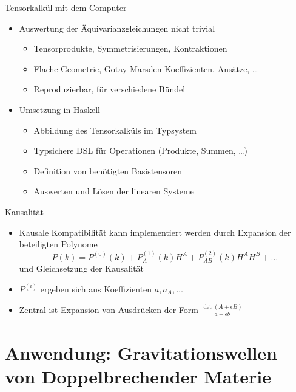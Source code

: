 \documentclass{beamer}
\begin{document}
    \begin{frame}{Tensorkalkül mit dem Computer}
        \begin{itemize}
            \item Auswertung der Äquivarianzgleichungen nicht trivial
            \begin{itemize}
                \item Tensorprodukte, Symmetrisierungen, Kontraktionen
                \item Flache Geometrie, Gotay-Marsden-Koeffizienten, Ansätze, \ldots
                \item Reproduzierbar, für verschiedene Bündel
            \end{itemize}
            \item Umsetzung in Haskell
            \begin{itemize}
                \item Abbildung des Tensorkalküls im Typsystem
                \item Typsichere DSL für Operationen (Produkte, Summen, \ldots)
                \item Definition von benötigten Basistensoren
                \item Auswerten und Lösen der linearen Systeme
            \end{itemize}
        \end{itemize}
    \end{frame}

    \begin{frame}{Kausalit\"at}
        \begin{itemize}
            \item Kausale Kompatibilität kann implementiert werden durch Expansion der beteiligten Polynome
            \[ P(k) = P^{(0)}(k) + P^{(1)}_A(k) H^A + P^{(2)}_{AB}(k) H^A H^B + \ldots \]
            und Gleichsetzung der Kausalität
            \item $P^{(i)}_{\dots}$ ergeben sich aus Koeffizienten $a, a_A, \ldots$
            \item Zentral ist Expansion von Ausdrücken der Form $\frac{\det (A + \epsilon B)}{a + \epsilon b}$
        \end{itemize}
    \end{frame}


    \section{Anwendung: Gravitationswellen von Doppelbrechender Materie}\label{sec:anwendung}
\end{document}
